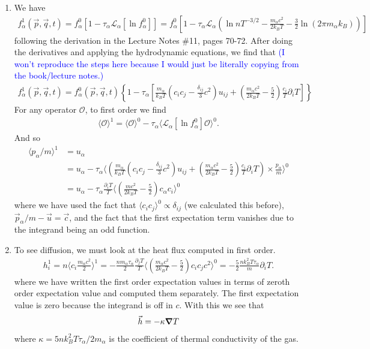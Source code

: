 \documentclass{article}
\theoremstyle{definition}
\newcommand{\p}{\partial}
\newcommand{\lag}{\mathcal{L}}
\newcommand{\al}{\alpha}
\newcommand{\f}[2]{\frac{#1}{#2}}
\newcommand{\lp}{\left(}
\newcommand{\rp}{\right)}
\newcommand{\lb}{\left[}
\newcommand{\rb}{\right]}
\newcommand{\lc}{\left\{}
\newcommand{\rc}{\right\}}
\begin{document}
\begin{enumerate}[label=(\alph*)]
	
	\item We have
	\begin{align*}
	f_\al^1(\vec{p},\vec{q},t) = f_\al^0 [1-\tau_\al \lag_\al[\ln f_\al^0]] = f_\al^0 \lb 1-\tau_\al \lag_\al\lp \ln  nT^{-3/2} - \f{m_\al c^2}{2k_BT} - \f{3}{2}\ln(2\pi m_\al k_B) \rp  \rb
	\end{align*}
	following the derivation in the Lecture Notes \#11, pages 70-72. After doing the derivatives and applying the hydrodynamic equations, we find that \textcolor{blue}{(I won't reproduce the steps here because I would just be literally copying from the book/lecture notes.)}
	\begin{align*}
	\boxed{f_\al^1(\vec{p},\vec{q},t)  =
	f_\al^0(\vec{p},\vec{q},t) 
	\lc 1- \tau_\al\lb  \f{m_\al}{k_BT} \lp c_i c_j  - \f{\delta_{ij}}{3}c^2 \rp u_{ij} + \lp \f{m_\al c^2}{2k_BT} - \f{5}{2} \rp\f{c_i}{T}\p_i T  \rb \rc}
	\end{align*}
	For any operator $\mathcal{O}$, to first order we find 
	\begin{align*}
	\langle \mathcal{O}\rangle^1 = \langle \mathcal{O}\rangle^0 -\tau_\al  \langle \lag_\al [\ln f_\al^0] \mathcal{O}\rangle^0.
	\end{align*}
	And so 
	\begin{align*}
	\langle p_\al/m \rangle^1 &= u_\al \\
	&= u_\al - \tau_\al \bigg\langle \lp \f{m_\al}{k_BT} \lp c_i c_j  - \f{\delta_{ij}}{3}c^2 \rp u_{ij} 
	+ \lp \f{m_\al c^2}{2k_BT} - \f{5}{2} \rp\f{c_i}{T}\p_i T   \rp \times \f{p_\al}{m}	 \bigg\rangle^0\\
	&= \boxed{u_\al - \tau_\al\f{\p_i T}{T}\bigg\langle \lp \f{mc^2}{2k_BT} - \f{5}{2}\rp c_\al c_i  \bigg\rangle^0 }
	\end{align*}
	where we have used the fact that $\langle c_i c_j\rangle^0 \propto \delta_{ij}$ (we calculated this before), $\vec{p}_\al/m - \vec{u}= \vec{c}$, and the fact that the first expectation term vanishes due to the integrand being an odd function. 
	
	
	
	\item To see diffusion, we must look at the heat flux computed in first order. 
	\begin{align*}
	h_i^1 = n \bigg\langle c_i \f{m_\al c^2}{2} \bigg\rangle^1 = -\f{nm_\al \tau_\al}{2}\f{\p_j T}{T}\bigg\langle \lp \f{m_\al c^2}{2k_BT} - \f{5}{2} \rp c_i c_j c^2  \bigg\rangle^0 = -\f{5}{2}\f{nk_B^2 T \tau_\al}{m}\p_i T.
	\end{align*}
	where we have written the first order expectation values in terms of zeroth order expectation value and computed them separately. The first expectation value is zero because the integrand is off in $c$. With this we see that 
	\begin{align*}
	\vec{h} = -\kappa \grad T 
	\end{align*}
	where $\kappa = 5nk_B^2  T \tau_\al/2m_\al$ is the coefficient of thermal conductivity of the gas. 
\end{enumerate}
\end{document}
